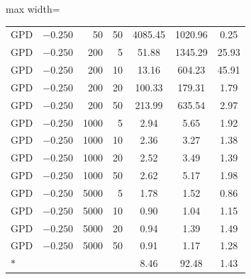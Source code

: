 \begin{table}[t]
\begin{adjustbox}{max width=\columnwidth}
\begin{tabular}{lrrr *{3}{c}}
GPD & $-0.250$ &   50 & 50 &  4085.45 & 1020.96 &  0.25 \\
GPD & $-0.250$ &  200 &  5 &    51.88 & 1345.29 & 25.93 \\
GPD & $-0.250$ &  200 & 10 &    13.16 &  604.23 & 45.91 \\
GPD & $-0.250$ &  200 & 20 &   100.33 &  179.31 &  1.79 \\
GPD & $-0.250$ &  200 & 50 &   213.99 &  635.54 &  2.97 \\
GPD & $-0.250$ & 1000 &  5 &     2.94 &    5.65 &  1.92 \\
GPD & $-0.250$ & 1000 & 10 &     2.36 &    3.27 &  1.38 \\
GPD & $-0.250$ & 1000 & 20 &     2.52 &    3.49 &  1.39 \\
GPD & $-0.250$ & 1000 & 50 &     2.62 &    5.17 &  1.98 \\
GPD & $-0.250$ & 5000 &  5 &     1.78 &    1.52 &  0.86 \\
GPD & $-0.250$ & 5000 & 10 &     0.90 &    1.04 &  1.15 \\
GPD & $-0.250$ & 5000 & 20 &     0.94 &    1.39 &  1.49 \\
GPD & $-0.250$ & 5000 & 50 &     0.91 &    1.17 &  1.28 \\
\midrule
$*$ &  &  &  &     8.46 &   92.48 &  1.43 \\
\bottomrule
\end{tabular}
\end{adjustbox}
\end{table}